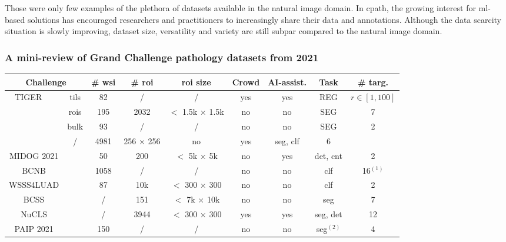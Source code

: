 Those were only few examples of the plethora of datasets available in the natural image domain. In \acrlong{cpath}, the growing interest for \acrshort{ml}-based solutions has encouraged researchers and practitioners to increasingly share their data and annotations. Although the data scarcity situation is slowly improving, dataset size, versatility and variety are still subpar compared to the natural image domain.

\subsubsection{A mini-review of Grand Challenge pathology datasets from 2021}
\label{sssec:backdp:grandchallenge}

\begin{table}
  \centering
  \footnotesize
  \begin{tabular}{|ccc|ccccccc|}
    \hline
    \multicolumn{3}{|c|}{Challenge} & \# \acrshort{wsi} & \# \acrshort{roi} & \acrshort{roi} size & Crowd & AI-assist. & Task & \# targ. \\
    \hline
    \multirow{3}{*}{TIGER} & \multirow{3}{*}{\cite{vanrijthoven2021tiger}} & tils & 82 & / &  / & yes & yes & REG & $r \in \left[1, 100\right]$\\
    & & rois & 195 & 2032 & $<$ 1.5k $\times$ 1.5k & no & no & SEG & 7\\
    & & bulk & 93 & / & / & no & no & SEG & 2 \\
    \hdashline
    \multicolumn{2}{|c|}{CoNiC} & \cite{graham2021conic} & / & 4981 & 256 $\times$ 256 & no & yes & \acrshort{seg}, \acrshort{clf} & 6 \\
    \multicolumn{2}{|c|}{MIDOG 2021} & \cite{aubreville2021mitosis} & 50 & 200 & $<$ 5k $\times$ 5k & no & yes & \acrshort{det}, \acrshort{cnt} & 2 \\
    \multicolumn{2}{|c|}{BCNB} & \cite{xu2021predicting} & 1058 & / & / & no & no & \acrshort{clf} & 16$^{(1)}$ \\
    \multicolumn{2}{|c|}{WSSS4LUAD} & \cite{han2021multilayer} & 87 & 10k & $<$ 300 $\times$ 300 & no & no & \acrshort{clf} & 2\\
    \multicolumn{2}{|c|}{BCSS} & \cite{amgad2019structured} & / & 151 & $<$ 7k $\times$ 10k & no & no & \acrshort{seg} & 7\\
    \multicolumn{2}{|c|}{NuCLS} &\cite{amgad2021nucls} &  / & 3944 & $<$ 300 $\times$ 300 & yes & yes & \acrshort{seg}, \acrshort{det} & 12 \\
    \multicolumn{2}{|c|}{PAIP 2021} & \cite{kang2021paip} & 150 & / & / & no & no & \acrshort{seg}$^{(2)}$ & 4 \\

\end{tabular}
\end{table}
